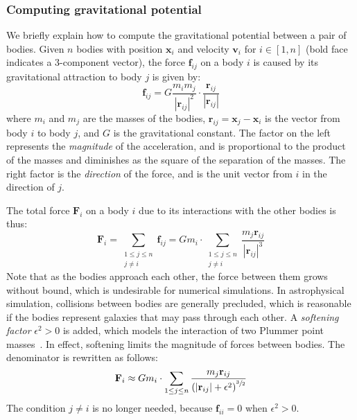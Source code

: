 \subsubsection{Computing gravitational potential}

We briefly explain how to compute the gravitational potential between a pair of
bodies. Given $n$ bodies with position $\mathbf{x}_i$ and velocity
$\mathbf{v}_i$ for $i \in [1,n]$ (bold face indicates a 3-component vector), the
force $\mathbf{f}_{ij}$ on a body $i$ is caused by its gravitational attraction
to body $j$ is given by:
%
\begin{equation*}
    \mathbf{f}_{ij}
      = G \frac{m_i m_j}{\left|\mathbf{r}_{ij}\right|^2}
        \cdot
        \frac{\mathbf{r}_{ij}}{\left|\mathbf{r}_{ij}\right|}
\end{equation*}
%
where $m_i$ and $m_j$ are the masses of the bodies, $\mathbf{r}_{ij} =
\mathbf{x}_j - \mathbf{x}_i$ is the vector from body $i$ to body $j$, and $G$ is
the gravitational constant. The factor on the left represents the
\emph{magnitude} of the acceleration, and is proportional to the product of the
masses and diminishes as the square of the separation of the masses. The right
factor is the \emph{direction} of the force, and is the unit vector from $i$ in
the direction of $j$.

The total force $\mathbf{F}_i$ on a body $i$ due to its interactions with the
other bodies is thus:
%
\begin{equation*}
    \mathbf{F}_i
      = \sum_{\substack{1 \le j \le n\\j \ne i}} \mathbf{f}_{ij}
      = G m_i \cdot \sum_{\substack{1 \le j \le n\\j \ne i}}
            \frac{m_j \mathbf{r}_{ij}}{\left|\mathbf{r}_{ij}\right|^3}
\end{equation*}
%
Note that as the bodies approach each other, the force between them grows
without bound, which is undesirable for numerical simulations. In astrophysical
simulation, collisions between bodies are generally precluded, which is
reasonable if the bodies represent galaxies that may pass through each other. A
\emph{softening factor} $\epsilon^2 > 0$ is added, which models the interaction
of two Plummer point masses~\cite{Aarseth:2003uz,Dyer:1993bk}. In effect,
softening limits the magnitude of forces between bodies. The denominator is
rewritten as follows:
%
\begin{equation*}
    \mathbf{F}_i \approx G m_i \cdot \sum_{1 \le j \le n}
        \frac{m_j \mathbf{r}_{ij}}
             {\left( \left|\mathbf{r}_{ij}\right| + \epsilon^2 \right)^{\sfrac{3}{2}}}
\end{equation*}
%
The condition $j \ne i$ is no longer needed, because $\mathbf{f}_{ii} = 0$ when
$\epsilon^2 > 0$.

